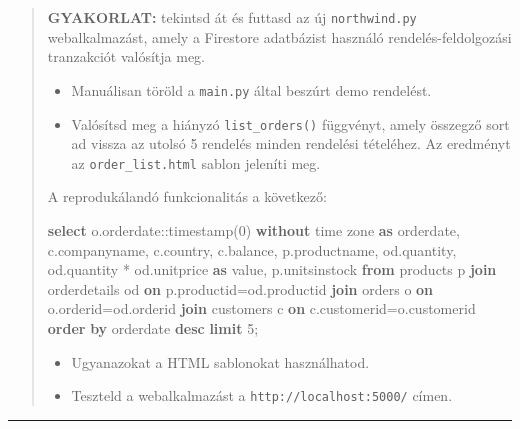 \documentclass[
  magyar,
]{article}
\newenvironment{Shaded}{}{}
\newcommand{\CharTok}[1]{\textcolor[rgb]{0.25,0.44,0.63}{#1}}
\newcommand{\DataTypeTok}[1]{\textcolor[rgb]{0.56,0.13,0.00}{#1}}
\newcommand{\DecValTok}[1]{\textcolor[rgb]{0.25,0.63,0.44}{#1}}
\newcommand{\FunctionTok}[1]{\textcolor[rgb]{0.02,0.16,0.49}{#1}}
\newcommand{\KeywordTok}[1]{\textcolor[rgb]{0.00,0.44,0.13}{\textbf{#1}}}
\newcommand{\NormalTok}[1]{#1}
\newcommand{\OperatorTok}[1]{\textcolor[rgb]{0.40,0.40,0.40}{#1}}
\providecommand{\tightlist}{%
  \setlength{\itemsep}{0pt}\setlength{\parskip}{0pt}}
\begin{document}
\begin{quote}
\textbf{GYAKORLAT:} tekintsd át és futtasd az új \texttt{northwind.py}
webalkalmazást, amely a Firestore adatbázist használó
rendelés-feldolgozási tranzakciót valósítja meg.

\begin{itemize}
\tightlist
\item
  Manuálisan töröld a \texttt{main.py} által beszúrt demo rendelést.
\item
  Valósítsd meg a hiányzó \texttt{list\_orders()} függvényt, amely
  összegző sort ad vissza az utolsó 5 rendelés minden rendelési
  tételéhez. Az eredményt az \texttt{order\_list.html} sablon jeleníti
  meg.
\end{itemize}

A reprodukálandó funkcionalitás a következő:

\begin{Shaded}
\begin{Highlighting}[]
\KeywordTok{select}\NormalTok{ o.orderdate:}\CharTok{:timestamp}\NormalTok{(}\DecValTok{0}\NormalTok{) }\KeywordTok{without} \DataTypeTok{time} \DataTypeTok{zone} \KeywordTok{as}\NormalTok{ orderdate,}
\NormalTok{c.companyname, c.country, c.balance, p.productname, od.quantity,}
\NormalTok{od.quantity }\OperatorTok{*}\NormalTok{ od.unitprice }\KeywordTok{as} \FunctionTok{value}\NormalTok{, p.unitsinstock}
\KeywordTok{from}\NormalTok{ products p }\KeywordTok{join}\NormalTok{ orderdetails od }\KeywordTok{on}\NormalTok{ p.productid}\OperatorTok{=}\NormalTok{od.productid}
    \KeywordTok{join}\NormalTok{ orders o }\KeywordTok{on}\NormalTok{ o.orderid}\OperatorTok{=}\NormalTok{od.orderid}
    \KeywordTok{join}\NormalTok{ customers c }\KeywordTok{on}\NormalTok{ c.customerid}\OperatorTok{=}\NormalTok{o.customerid}
\KeywordTok{order} \KeywordTok{by}\NormalTok{ orderdate }\KeywordTok{desc} \KeywordTok{limit} \DecValTok{5}\NormalTok{;}
\end{Highlighting}
\end{Shaded}

\begin{itemize}
\tightlist
\item
  Ugyanazokat a HTML sablonokat használhatod.
\item
  Teszteld a webalkalmazást a \texttt{http://localhost:5000/} címen.
\end{itemize}
\end{quote}

\begin{center}\rule{0.5\linewidth}{0.5pt}\end{center}
\end{document}
